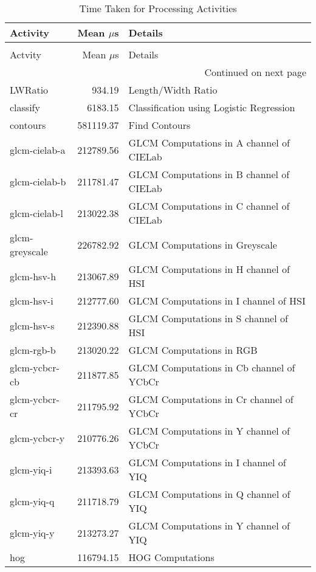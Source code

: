 \begin{longtable}{lrl}
\caption[Time Taken for Processing Activities]{Time Taken for Processing Activites}
\label{table:performance}\\
\toprule
Activity & Mean $\mu$s   & Details                   \\
\midrule
\endfirsthead
\caption[]{Time Taken for Processing Activities} \\
\toprule
Actvity & Mean $\mu$s   & Details                    \\
\midrule
\endhead
\midrule
\multicolumn{3}{r}{{Continued on next page}} \\
\midrule
\endfoot

\bottomrule
\endlastfoot
LWRatio         &     934.19 & Length/Width Ratio\\
classify        &    6183.15 & Classification using Logistic Regression\\
contours        &  581119.37 & Find Contours\\
glcm-cielab-a   &  212789.56 & GLCM Computations in A channel of CIELab\\
glcm-cielab-b   &  211781.47 & GLCM Computations in B channel of CIELab\\
glcm-cielab-l   &  213022.38 & GLCM Computations in C channel of CIELab\\
glcm-greyscale  &  226782.92 & GLCM Computations in Greyscale\\
glcm-hsv-h      &  213067.89 & GLCM Computations in H channel of HSI\\
glcm-hsv-i      &  212777.60 &GLCM Computations in I channel of HSI\\
glcm-hsv-s      &  212390.88 &GLCM Computations in S channel of HSI\\
glcm-rgb-b      &  213020.22 &GLCM Computations in RGB\\
glcm-ycbcr-cb   &  211877.85 &GLCM Computations in Cb channel of YCbCr\\
glcm-ycbcr-cr   &  211795.92 &GLCM Computations in Cr channel of YCbCr\\
glcm-ycbcr-y    &  210776.26 &GLCM Computations in Y channel of YCbCr\\
glcm-yiq-i      &  213393.63 &GLCM Computations in I channel of YIQ\\
glcm-yiq-q      &  211718.79 &GLCM Computations in Q channel of YIQ\\
glcm-yiq-y      &  213273.27 &GLCM Computations in Y channel of YIQ\\
hog             &  116794.15 & HOG Computations\\

\end{longtable}
